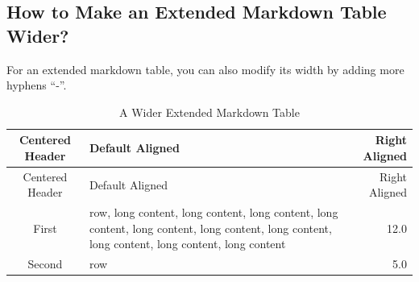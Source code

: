 \documentclass[10pt, a4paper, oneside]{book}
\begin{document}
\subsection{How to Make an Extended Markdown Table Wider?}\label{how-to-make-an-extended-markdown-table-wider}

For an extended markdown table, you can also modify its width by adding more hyphens ``-''.

\begin{longtable}[c]{@{}clr@{}}
\caption{A Wider Extended Markdown Table \label{wem-table}}\tabularnewline
\toprule
\begin{minipage}[b]{0.27\columnwidth}\centering\strut
Centered
Header
\strut\end{minipage} & \begin{minipage}[b]{0.41\columnwidth}\raggedright\strut
Default
Aligned
\strut\end{minipage} & \begin{minipage}[b]{0.19\columnwidth}\raggedleft\strut
Right
Aligned
\strut\end{minipage}\tabularnewline
\midrule
\endfirsthead
\toprule
\begin{minipage}[b]{0.27\columnwidth}\centering\strut
Centered
Header
\strut\end{minipage} & \begin{minipage}[b]{0.41\columnwidth}\raggedright\strut
Default
Aligned
\strut\end{minipage} & \begin{minipage}[b]{0.19\columnwidth}\raggedleft\strut
Right
Aligned
\strut\end{minipage}\tabularnewline
\midrule
\endhead
\begin{minipage}[t]{0.27\columnwidth}\centering\strut
First
\strut\end{minipage} & \begin{minipage}[t]{0.41\columnwidth}\raggedright\strut
row,
long content,
long content,
long content,
long content,
long content,
long content,
long content,
long content,
long content,
long content
\strut\end{minipage} & \begin{minipage}[t]{0.19\columnwidth}\raggedleft\strut
12.0
\strut\end{minipage}\tabularnewline
\begin{minipage}[t]{0.27\columnwidth}\centering\strut
Second
\strut\end{minipage} & \begin{minipage}[t]{0.41\columnwidth}\raggedright\strut
row
\strut\end{minipage} & \begin{minipage}[t]{0.19\columnwidth}\raggedleft\strut
5.0
\strut\end{minipage}\tabularnewline
\bottomrule
\end{longtable}
\end{document}
